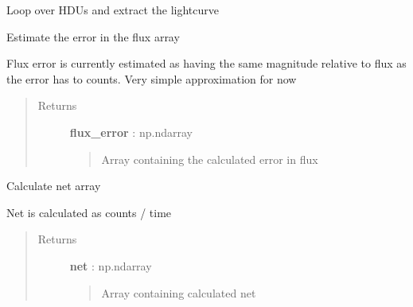 \documentclass[letterpaper,10pt,english]{sphinxmanual}
\begin{document}
\begin{fulllineitems}

\begin{fulllineitems}
\label{index:lightcurve.cos.CosCurve.extract}
Loop over HDUs and extract the lightcurve

\end{fulllineitems}


\begin{fulllineitems}
\label{index:lightcurve.cos.CosCurve.flux_error}
Estimate the error in the flux array

Flux error is currently estimated as having the same magnitude
relative to flux as the error has to counts.  Very simple approximation
for now
\begin{quote}\begin{description}
\item[{Returns }] \leavevmode
\textbf{flux\_error} : np.ndarray
\begin{quote}

Array containing the calculated error in flux
\end{quote}

\end{description}\end{quote}

\end{fulllineitems}


\begin{fulllineitems}
\label{index:lightcurve.cos.CosCurve.net}
Calculate net array

Net is calculated as counts / time
\begin{quote}\begin{description}
\item[{Returns }] \leavevmode
\textbf{net} : np.ndarray
\begin{quote}

Array containing calculated net
\end{quote}

\end{description}\end{quote}


\end{fulllineitems}
\end{fulllineitems}
\end{document}
